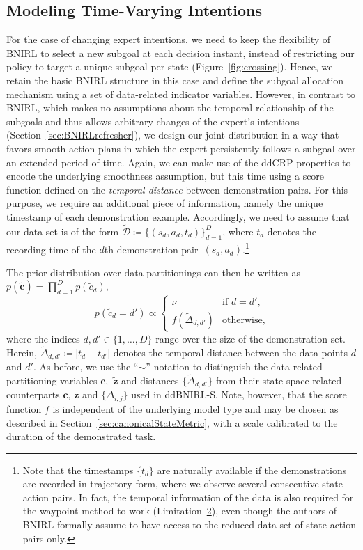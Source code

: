 \documentclass[twoside,11pt]{article}
\newcommand{\p}{p}
\newcommand{\defeq}{\coloneqq}
\newcommand{\eqkomma}{,}
\newcommand{\ddBNIRLS}{\mbox{ddBNIRL-S}}
\begin{document}
\subsection{Modeling Time-Varying Intentions}
\label{sec:ddBNIRL-T}
For the case of changing expert intentions, we %
need to keep the flexibility of BNIRL to %
select a new subgoal at each decision instant, %
instead of restricting our policy %
to target a unique subgoal per state (Figure~\ref{fig:crossing}). Hence, we %
retain the basic BNIRL structure in this case
%
and %
%
%
%
define the subgoal allocation mechanism using a set of data-related indicator variables. However, in contrast to BNIRL, which makes 
no assumptions %
about the temporal relationship of the subgoals %
and %
thus allows %
arbitrary changes of the expert's intentions (Section~\ref{sec:BNIRLrefresher}), we design our joint distribution in a way that favors smooth action plans in which the expert persistently follows a subgoal over an extended period of time. Again, we can %
make use of the ddCRP properties to encode the underlying smoothness assumption, but this time %
using a %
score function defined on the %
\textit{temporal distance} %
between demonstration pairs. %
For this purpose, we require an additional piece of information, namely the unique timestamp of each demonstration example. %
Accordingly, we need to assume that our data set is of the form $\widetilde{\mathcal{D}}\defeq\{(s_d,a_d,t_d)\}_{d=1}^D$, where $t_d$ denotes the recording time of the $d$th demonstration pair~$(s_d,a_d)$.\footnote{Note that %
the timestamps $\{t_d\}$ are naturally available if the demonstrations are recorded in trajectory form, where we observe several consecutive state-action pairs. In fact, the temporal information of the data is also required for the waypoint method to work (Limitation~\hyperref[phantom:lim2]{2}), even though the authors %
of BNIRL formally assume to have access to the reduced data set of state-action pairs only.} %

The %
prior distribution over data partitionings can then be written as
$\p(\mathbf{\tilde{c}})=\prod_{d=1}^{D}\p(\tilde{c}_d)$,
\begin{equation*}
\p(\tilde{c}_d=d') \propto \begin{cases} \nu & \text{if } d=d'\eqkomma \\ f(\widetilde{\Delta}_{d,d'}) &  \text{otherwise}\eqkomma \end{cases}
\end{equation*}
where the indices $d,d'\in\{1,\ldots,D\}$ range over the size of the demonstration set. Herein, %
$\widetilde{\Delta}_{d,d'} \defeq \lvert t_d - t_{d'} \rvert$ denotes the temporal distance between the data points $d$ and $d'$. %
As before, we use the \mbox{``$\sim$''-notation} to distinguish the data-related partitioning variables $\mathbf{\tilde{c}}$,~$\mathbf{\tilde{z}}$ and distances $\{\widetilde{\Delta}_{d,d'}\}$ from their state-space-related counterparts $\mathbf{c}$, $\mathbf{z}$ and $\{{\Delta}_{i,j}\}$ used in %
\ddBNIRLS. %
Note, however, that the score function $f$ is independent of the underlying model type and may be chosen as described in Section~\ref{sec:canonicalStateMetric}, %
with a scale calibrated to the duration of the demonstrated task.
\end{document}
